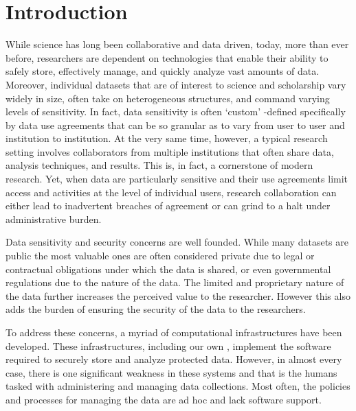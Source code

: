 \section{Introduction}



While science has long been collaborative and data driven, today, more than ever before, 
researchers are dependent on technologies that enable their ability to safely store, 
effectively manage, and quickly analyze vast amounts of
data. Moreover, individual datasets that are of interest to science and scholarship 
vary widely in size, often take on heterogeneous structures, and command varying 
levels of sensitivity. In fact, data sensitivity is often `custom' -defined specifically by
data use agreements that can be so granular as to vary from user to user and institution 
to institution. At the very same time, however, a typical research setting involves 
collaborators from multiple institutions that often share data, analysis techniques, 
and results. This is, in fact, a cornerstone of modern research. Yet, when data are 
particularly sensitive and their use agreements limit access and activities at the 
level of individual users, research collaboration can either lead to inadvertent 
breaches of agreement or can grind to a halt under administrative burden.



Data sensitivity and security concerns are well founded. While many datasets are public the most
valuable ones are often considered private due to legal or contractual obligations under which the data
is shared, or even governmental regulations due to the nature of the data. The limited and proprietary nature
of the data further increases the perceived value to the researcher. However this also adds the burden of
ensuring the security of the data to the researchers.

To address these concerns, a myriad of computational infrastructures
have been developed. These infrastructures, including our own \NAMENS \cite{babuji2016cloud},
implement the software required to securely store and analyze protected
data. However, in almost every case, there is one significant weakness in these systems
and that is the humans tasked with administering and managing 
data collections. Most often, the policies and processes for managing
the data are ad hoc and lack software support. 


